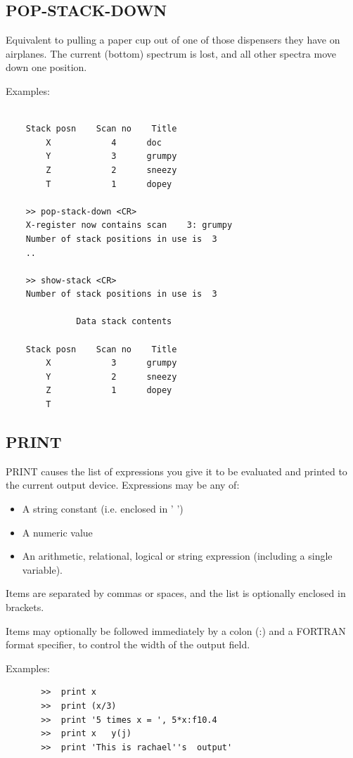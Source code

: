 \documentclass[11pt,twoside]{report}
\begin{document}
\subsection{POP-STACK-DOWN} 

Equivalent to pulling a paper cup out of one of those dispensers they have on
airplanes. The current (bottom) spectrum is lost, and all other spectra
move down one position.

Examples:
\begin{verbatim}

    Stack posn    Scan no    Title
        X            4      doc
        Y            3      grumpy
        Z            2      sneezy
        T            1      dopey

    >> pop-stack-down <CR>
    X-register now contains scan    3: grumpy
    Number of stack positions in use is  3
    ..

    >> show-stack <CR>
    Number of stack positions in use is  3

              Data stack contents

    Stack posn    Scan no    Title
        X            3      grumpy
        Y            2      sneezy
        Z            1      dopey
        T

\end{verbatim}

\subsection{PRINT} 

PRINT causes the list of expressions you give it to be evaluated and printed to
the current output device. Expressions may be any of:
\begin{itemize}
\item    A string constant (i.e. enclosed in ' ')
\item    A numeric value
\item    An arithmetic, relational, logical or string expression (including a single variable).
\end{itemize}
Items are separated by commas or spaces, and the list is optionally enclosed
in brackets.

Items may optionally be followed immediately by a colon (:) and a FORTRAN
format specifier, to control the width of the output field.

Examples:
\begin{verbatim}
       >>  print x
       >>  print (x/3)
       >>  print '5 times x = ', 5*x:f10.4
       >>  print x   y(j)
       >>  print 'This is rachael''s  output'
\end{verbatim}
\end{document}

